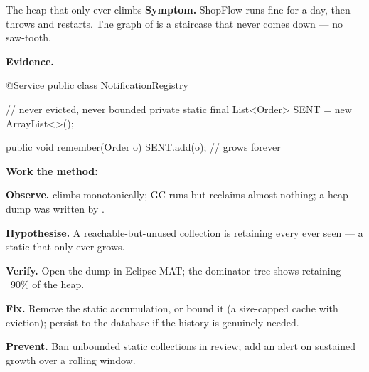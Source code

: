 
\begin{debuglab}{The heap that only ever climbs}
\textbf{Symptom.} ShopFlow runs fine for a day, then throws  and restarts. The graph of  is a staircase that never comes down --- no saw-tooth.

\smallskip\textbf{Evidence.}
\begin{javabox}
@Service
public class NotificationRegistry {
  // never evicted, never bounded
  private static final List<Order> SENT = new ArrayList<>();

  public void remember(Order o) { SENT.add(o); }  // grows forever
}
\end{javabox}

\textbf{Work the method:}
\begin{tickcheck}
  \item \textbf{Observe.}  climbs monotonically; GC runs but reclaims almost nothing; a heap dump was written by .
  \item \textbf{Hypothesise.} A reachable-but-unused collection is retaining every  ever seen --- a static  that only ever grows.
  \item \textbf{Verify.} Open the dump in Eclipse MAT; the dominator tree shows  retaining ~90\% of the heap.
  \item \textbf{Fix.} Remove the static accumulation, or bound it (a size-capped cache with eviction); persist to the database if the history is genuinely needed.
  \item \textbf{Prevent.} Ban unbounded static collections in review; add an alert on sustained  growth over a rolling window.
\end{tickcheck}
\end{debuglab}

